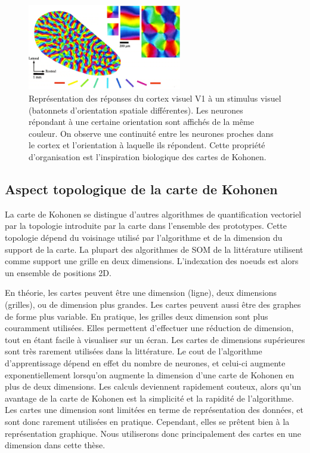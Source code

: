 \begin{figure}
\centering
\includegraphics[width=0.6\textwidth]{v1.jpg}
\caption{Représentation des réponses du cortex visuel V1 à un stimulus visuel (batonnets d'orientation spatiale différentes). Les neurones répondant à une certaine orientation sont affichés de la même couleur. On observe une continuité entre les neurones proches dans le cortex et l'orientation à laquelle ils répondent. Cette propriété d'organisation est l'inspiration biologique des cartes de Kohonen. }
\label{fig:v1}
\end{figure}

\subsection{Aspect topologique de la carte de Kohonen}

La carte de Kohonen se distingue d'autres algorithmes de quantification vectoriel par la topologie introduite par la carte dans l'ensemble des prototypes. Cette topologie dépend du voisinage utilisé par l'algorithme et de la dimension du support de la carte.
La plupart des algorithmes de SOM de la littérature utilisent comme support une grille en deux dimensions. L'indexation des noeuds est alors un ensemble de positions 2D.


En théorie, les cartes peuvent être une dimension (ligne), deux dimensions (grilles), ou de dimension plus grandes. Les cartes peuvent aussi être des graphes de forme plus variable. En pratique, les grilles deux dimension sont plus couramment utilisées. Elles permettent d'effectuer une réduction de dimension, tout en étant facile à visualiser sur un écran. Les cartes de dimensions supérieures sont très rarement utilisées dans la littérature. Le cout de l'algorithme d'apprentissage dépend en effet du nombre de neurones, et celui-ci augmente exponentiellement lorsqu'on augmente la dimension d'une carte de Kohonen en plus de deux dimensions. Les calculs deviennent rapidement couteux, alors qu'un avantage de la carte de Kohonen est la simplicité et la rapidité de l'algorithme. Les cartes une dimension sont limitées en terme de représentation des données, et sont donc rarement utilisées en pratique. Cependant, elles se prêtent bien à la représentation graphique. Nous utiliserons donc principalement des cartes en une dimension dans cette thèse.


